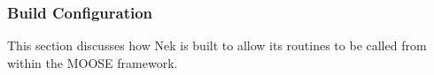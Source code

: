 \documentclass[10pt]{article}
\numberwithin{equation}{section} %
\begin{document}

\subsubsection{Build Configuration}
This section discusses how Nek is built to allow its routines to be called from within the MOOSE framework.
\end{document}
